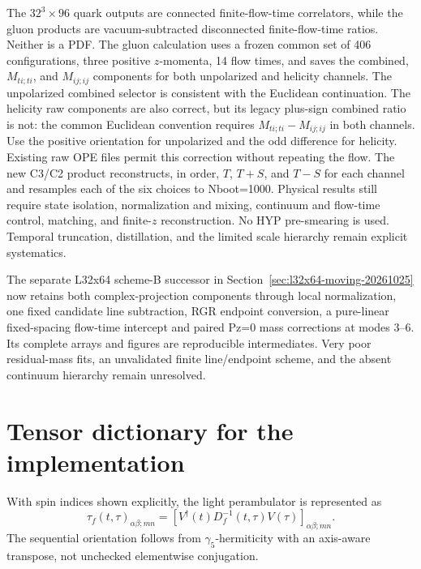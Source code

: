 \documentclass[11pt]{article}
\numberwithin{equation}{section}
\begin{document}
The \(32^3\times96\) quark outputs are connected finite-flow-time correlators,
while the gluon products are vacuum-subtracted disconnected finite-flow-time
ratios.  Neither is a PDF.  The gluon calculation uses a frozen common set of
406 configurations, three positive \(z\)-momenta, 14 flow times, and saves
the combined, \(M_{ti;ti}\), and \(M_{ij;ij}\) components for both
unpolarized and helicity channels.  The unpolarized combined selector is
consistent with the Euclidean continuation.  The helicity raw components are
also correct, but its legacy plus-sign combined ratio is not: the common
Euclidean convention requires \(M_{ti;ti}-M_{ij;ij}\) in both channels.
Use the positive orientation for unpolarized and the odd difference for
helicity.  Existing raw OPE files permit this
correction without repeating the flow.  The new C3/C2 product reconstructs, in
order, \(T\), \(T+S\), and \(T-S\) for each channel and resamples each of the
six choices to Nboot=1000.  Physical results still require state isolation,
normalization and mixing, continuum and flow-time control, matching, and
finite-\(z\) reconstruction.  No HYP pre-smearing is used.
Temporal truncation, distillation, and the limited scale hierarchy remain
explicit systematics.

The separate L32x64 scheme-B successor in
Section~\ref{sec:l32x64-moving-20261025} now retains both complex-projection
components through local normalization, one fixed candidate line
subtraction, RGR endpoint conversion, a pure-linear fixed-spacing
flow-time intercept and paired Pz=0 mass corrections at modes 3--6.
Its complete arrays and figures are reproducible intermediates.
Very poor residual-mass fits, an unvalidated finite line/endpoint scheme,
and the absent continuum hierarchy remain unresolved.

\appendix

\section{Tensor dictionary for the implementation}

With spin indices shown explicitly, the light perambulator is represented as
\begin{equation}
  \tau_f(t,\tau)_{\alpha\beta;mn}
  =
  \left[V^\dagger(t)D_f^{-1}(t,\tau)V(\tau)\right]_{\alpha\beta;mn}.
\end{equation}
The sequential orientation follows from \(\gamma_5\)-hermiticity with an
axis-aware transpose, not unchecked elementwise conjugation.
\end{document}
